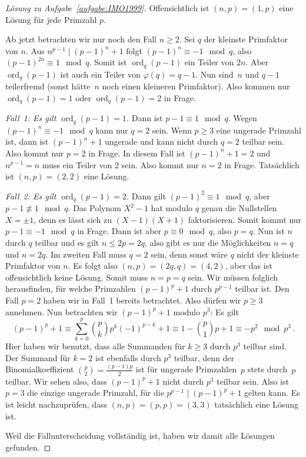 \begin{proof}[Lösung zu Aufgabe~\ref{aufgabe:IMO1999}]
	Offensichtlich ist $(n,p)=(1,p)$ eine Lösung für jede Primzahl $p$.
	
	Ab jetzt betrachten wir nur noch den Fall $n\geqslant 2$. Sei $q$ der kleinste Primfaktor von $n$. Aus $n^{p-1}\mid (p-1)^n+1$ folgt $(p-1)^n\equiv -1\mod q$, also $(p-1)^{2n}\equiv 1\mod q$. Somit ist $\operatorname{ord}_q(p-1)$ ein Teiler von $2n$. Aber $\operatorname{ord}_q(p-1)$ ist auch ein Teiler von $\varphi(q)=q-1$. Nun sind~$n$ und $q-1$ teilerfremd (sonst hätte~$n$ noch einen kleineren Primfaktor). Also kommen nur $\operatorname{ord}_q(p-1)=1$ oder $\operatorname{ord}_q(p-1)=2$ in Frage. 
	
	\emph{Fall~1: Es gilt $\operatorname{ord}_q(p-1)=1$.} Dann ist $p-1\equiv 1\mod q$. Wegen $(p-1)^n\equiv -1\mod q$ kann nur $q=2$ sein. Wenn $p\geqslant 3$ eine ungerade Primzahl ist, dann ist $(p-1)^n+1$ ungerade und kann nicht durch $q=2$ teilbar sein. Also kommt nur $p=2$ in Frage. In diesem Fall ist $(p-1)^n+1=2$ und $n^{p-1}=n$ muss ein Teiler von $2$ sein. Also kommt nur $n=2$ in Frage. Tatsächlich ist $(n,p)=(2,2)$ eine Lösung.
	
	\emph{Fall~2: Es gilt $\operatorname{ord}_q(p-1)=2$.} Dann gilt $(p-1)^2\equiv 1\mod q$, aber $p-1\not\equiv1\mod q$. Das Polynom $X^2-1$ hat modulo $q$ genau die Nullstellen $X=\pm 1$, denn es lässt sich zu $(X-1)(X+1)$ faktorisieren. Somit kommt nur $p-1\equiv -1\mod q$ in Frage. Dann ist aber $p\equiv 0\mod q$, also $p=q$. Nun ist $n$ durch $q$ teilbar und es gilt $n\leqslant 2p=2q$, also gibt es nur die Möglichkeiten $n=q$ und $n=2q$. Im zweiten Fall muss $q=2$ sein, denn sonst wäre $q$ nicht der kleinste Primfaktor von $n$. Es folgt also $(n,p)=(2q,q)=(4,2)$, aber das ist offensichtlich keine Lösung. Somit muss $n=p=q$ sein. Wir müssen folglich herausfinden, für welche Primzahlen $(p-1)^p+1$ durch $p^{p-1}$ teilbar ist. Den Fall $p=2$ haben wir in Fall~1 bereits betrachtet. Also dürfen wir $p\geqslant 3$ annehmen. Nun betrachten wir $(p-1)^p+1$ modulo $p^3$: Es gilt
	\begin{equation*}
		(p-1)^p+1\equiv \sum_{k=0}^p\binom{p}{k}p^k(-1)^{p-k}+1\equiv 1-\binom{p}{1}p+1\equiv -p^2\mod p^3\,.
	\end{equation*}
	Hier haben wir benutzt, dass alle Summanden für $k\geqslant 3$ durch $p^3$ teilbar sind. Der Summand für $k=2$ ist ebenfalls durch $p^3$ teilbar, denn der Binomialkoeffizient $\binom{p}{2}=\frac{(p-1)p}{2}$ ist für ungerade Primzahlen~$p$ stets durch~$p$ teilbar. Wir sehen also, dass $(p-1)^p+1$ nicht durch $p^3$ teilbar sein. Also ist $p=3$ die einzige ungerade Primzahl, für die $p^{p-1}\mid (p-1)^p+1$ gelten kann. Es ist leicht nachzuprüfen, dass $(n,p)=(p,p)=(3,3)$ tatsächlich eine Lösung ist.
	
	Weil die Fallunterscheidung vollständig ist, haben wir damit alle Lösungen gefunden.
\end{proof}

